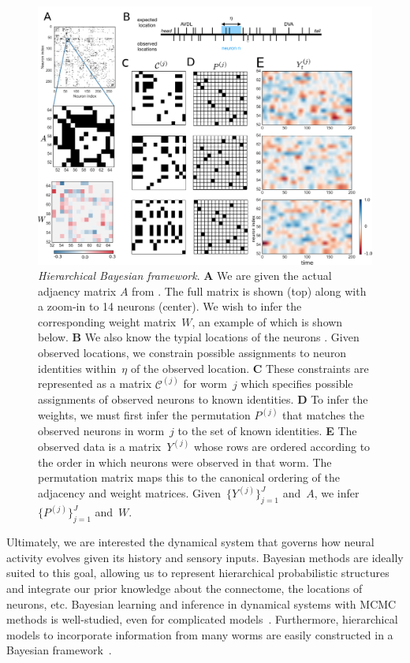 \documentclass{article}
\begin{document}
\begin{figure}[t]
  \centering
  \includegraphics[width=5.0in]{Figure1.pdf} 
  \caption{\textit{Hierarchical Bayesian framework}.  \textbf{A} We
    are given the actual adjaency matrix $A$ from
    \citep{varshney2011structural}. The full matrix is shown (top)
    along with a zoom-in to 14 neurons (center).  We wish to infer the
    corresponding weight matrix~$W$, an example of which is shown
    below.  \textbf{B} We also know the typial locations of the
    neurons \citep{white1986structure,wormatlas}. Given observed
    locations, we constrain possible assignments to neuron identities
    within~$\eta$ of the observed location.  \textbf{C} These
    constraints are represented as a matrix $\mathcal{C}^{(j)}$ for
    worm~$j$ which specifies possible assignments of observed neurons
    to known identities.  \textbf{D} To infer the weights, we must
    first infer the permutation $P^{(j)}$ that matches the observed
    neurons in worm~$j$ to the set of known identities.
    \textbf{E} The observed data is a matrix~$Y^{(j)}$ whose rows
    are ordered according to the order in which neurons were observed
    in that worm.  The permutation matrix maps this to the canonical
    ordering of the adjacency and weight matrices. Given~$\{Y^{(j)}\}_{j=1}^J$ and~$A$, we infer~$\{P^{(j)}\}_{j=1}^J$ and~$W$.}
\label{fig:1}
\end{figure}

Ultimately, we are interested the dynamical system that governs how
neural activity evolves given its history and sensory inputs.
Bayesian methods are ideally suited to this goal, allowing us to
represent hierarchical probabilistic structures and integrate our
prior knowledge about the connectome, the locations of neurons, etc.
Bayesian learning and inference in dynamical systems with MCMC methods
is well-studied, even for complicated
models~\citep{Freitas2001,Paninski2010}. Furthermore, hierarchical
models to incorporate information from many worms are easily
constructed in a Bayesian framework~\citep{Gelman2014}.
\end{document}
